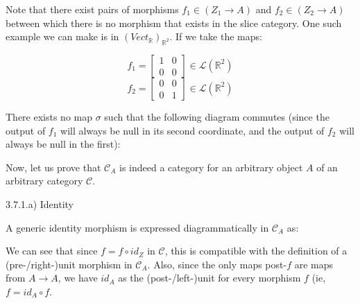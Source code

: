 Note that there exist pairs of morphisms $f_1 \in (Z_1 \to A)$ and $f_2 \in (Z_2 \to A)$ between which there is no morphism that exists in the slice category. One such example we can make is in $(Vect_\mathbb{R})_{\mathbb{R}^2}$. If we take the maps:

$$f_1 = \begin{bmatrix} 1 & 0 \\ 0 & 0 \end{bmatrix} \in \mathcal{L}(\mathbb{R}^2)$$
$$f_2 = \begin{bmatrix} 0 & 0 \\ 0 & 1 \end{bmatrix} \in \mathcal{L}(\mathbb{R}^2)$$

There exists no map $\sigma$ such that the following diagram commutes (since the output of $f_1$ will always be null in its second coordinate, and the output of $f_2$ will always be null in the first):


Now, let us prove that $\mathcal{C}_A$ is indeed a category for an arbitrary object $A$ of an arbitrary category $\mathcal{C}$.

3.7.1.a) Identity

A generic identity morphism is expressed diagrammatically in $\mathcal{C}_A$ as:


We can see that since $f = f \circ id_Z$ in $\mathcal{C}$, this is compatible with the definition of a (pre-/right-)unit morphism in $\mathcal{C}_A$. Also, since the only maps post-$f$ are maps from $A \to A$, we have $id_A$ as the (post-/left-)unit for every morphism $f$ (ie, $f = id_A \circ f$. 

